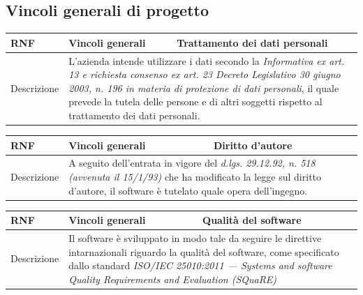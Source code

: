 \documentclass{scrreprt}
\begin{document}

	\subsection{Vincoli generali di progetto}
	\FloatBarrier
	\begin{table}[h|]
	\centering
	\begin{tabular}{|l|p{6cm}|p{6cm}|}
	\hline
	\textbf{RNF\thernf} & \textbf{Vincoli generali} & \textbf{Trattamento dei dati personali} \\ \hline
	Descrizione  & \multicolumn{2}{p{12cm}|}{ L'azienda intende utilizzare i dati secondo la \textit{Informativa ex art. 13 e richiesta consenso ex art. 23 Decreto Legislativo 30 giugno 2003, n. 196 in materia di protezione di dati personali}, il quale prevede la tutela delle persone e di altri
soggetti rispetto al trattamento dei dati personali. }                  \\ \hline
	\end{tabular}
	\end{table}
	\FloatBarrier
	
	\FloatBarrier
	\begin{table}[h|]
	\centering
	\begin{tabular}{|l|p{6cm}|p{6cm}|}
	\hline
	\textbf{RNF\thernf} & \textbf{Vincoli generali} & \textbf{Diritto d'autore} \\ \hline
	Descrizione  & \multicolumn{2}{p{12cm}|}{ A seguito dell'entrata in vigore del \textit{d.lgs. 29.12.92, n. 518 (avvenuta il 15/1/93)} che ha modificato la legge sul diritto d'autore, il software è tutelato quale opera dell'ingegno. }                  \\ \hline
	\end{tabular}
	\end{table}
	\FloatBarrier
	
	\FloatBarrier
	\begin{table}[h|]
	\centering
	\begin{tabular}{|l|p{6cm}|p{6cm}|}
	\hline
	\textbf{RNF\thernf} & \textbf{Vincoli generali} & \textbf{Qualità del software} \\ \hline
	Descrizione  & \multicolumn{2}{p{12cm}|}{ Il software è sviluppato in modo tale da seguire le direttive intarnazionali riguardo la qualità del software, come specificato dallo standard \textit{ISO/IEC 25010:2011 — Systems and software Quality Requirements and Evaluation (SQuaRE)}}                  \\ \hline
	\end{tabular}
	\end{table}
	\FloatBarrier
\end{document}

